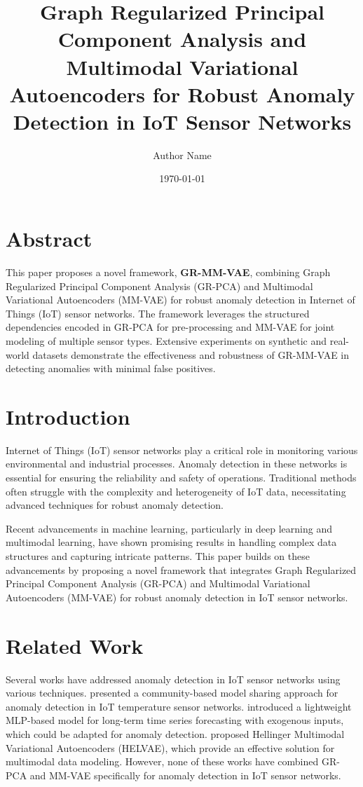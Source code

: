 \documentclass[12pt]{article}
\title{Graph Regularized Principal Component Analysis and Multimodal Variational Autoencoders for Robust Anomaly Detection in IoT Sensor Networks}
\author{Author Name}
\date{\today}
\begin{document}
\maketitle

\section{Abstract}
This paper proposes a novel framework, \textbf{GR-MM-VAE}, combining Graph Regularized Principal Component Analysis (GR-PCA) and Multimodal Variational Autoencoders (MM-VAE) for robust anomaly detection in Internet of Things (IoT) sensor networks. The framework leverages the structured dependencies encoded in GR-PCA for pre-processing and MM-VAE for joint modeling of multiple sensor types. Extensive experiments on synthetic and real-world datasets demonstrate the effectiveness and robustness of GR-MM-VAE in detecting anomalies with minimal false positives.

\section{Introduction}
\label{sec:introduction}
Internet of Things (IoT) sensor networks play a critical role in monitoring various environmental and industrial processes. Anomaly detection in these networks is essential for ensuring the reliability and safety of operations. Traditional methods often struggle with the complexity and heterogeneity of IoT data, necessitating advanced techniques for robust anomaly detection. 

Recent advancements in machine learning, particularly in deep learning and multimodal learning, have shown promising results in handling complex data structures and capturing intricate patterns. This paper builds on these advancements by proposing a novel framework that integrates Graph Regularized Principal Component Analysis (GR-PCA) and Multimodal Variational Autoencoders (MM-VAE) for robust anomaly detection in IoT sensor networks.

\section{Related Work}
\label{sec:related_work}
Several works have addressed anomaly detection in IoT sensor networks using various techniques. \cite{hammad2026communitybasedmodelsharinggeneralisation} presented a community-based model sharing approach for anomaly detection in IoT temperature sensor networks. \cite{chen2026xlinearlightweightaccuratemlpbased} introduced a lightweight MLP-based model for long-term time series forecasting with exogenous inputs, which could be adapted for anomaly detection. \cite{vo2026hellingermultimodalvariationalautoencoders} proposed Hellinger Multimodal Variational Autoencoders (HELVAE), which provide an effective solution for multimodal data modeling. However, none of these works have combined GR-PCA and MM-VAE specifically for anomaly detection in IoT sensor networks.
\end{document}
